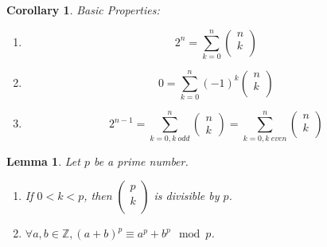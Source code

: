 \documentclass[12pt]{article}
\newtheorem{lemma}{Lemma}[subsection]
\newtheorem{corollary}{Corollary}[subsection]
\begin{document}
    \begin{corollary}
            Basic Properties:
        \begin{enumerate}
            \item
                \begin{equation} 
                2^n = \sum^n_{k=0}\left(\begin{array}{c} n\\k\\\end{array}\right)
                \end{equation}
            \item
                \begin{equation} 
                0 = \sum^n_{k=0}(-1)^k\left(\begin{array}{c} n\\k\\\end{array}\right)
                \end{equation}
            \item
                \begin{equation} 
                2^{n-1} = \sum^n_{k=0, k\ odd}\left(\begin{array}{c} n\\k\end{array}\right) = \sum^n_{k=0, k\ even}\left(\begin{array}{c} n\\k\\\end{array}\right)
                \end{equation}
        \end{enumerate}

    \end{corollary}
    \begin{lemma}
        Let $p$ be a prime number.
        \begin{enumerate}
            \item If $0 < k < p$, then $\left(\begin{array}{c} p\\k\\\end{array}\right)$ is divisible by $p$.
            \item $\forall a, b \in \mathbb{Z}, (a+b)^p \equiv a^p + b^p \mod p$.
        \end{enumerate}

    \end{lemma}
\end{document}
